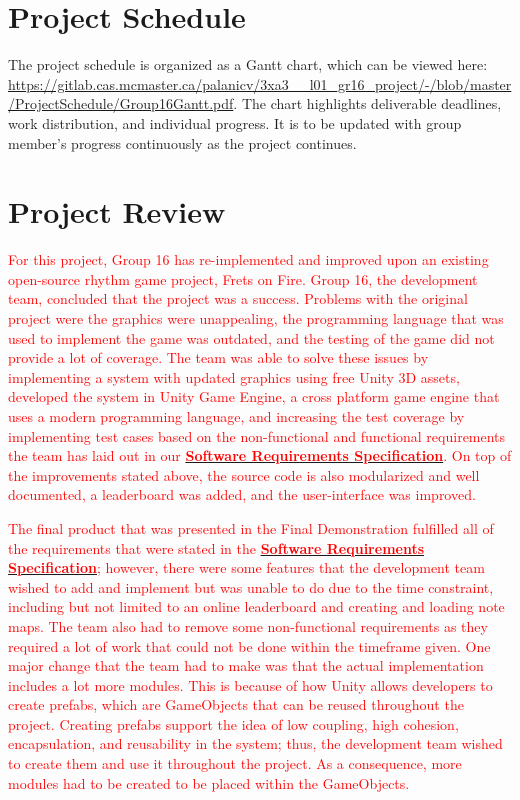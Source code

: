 \documentclass[12pt,letterpaper]{article}
\begin{document}
\section{Project Schedule}
The project schedule is organized as a Gantt chart, which can be viewed here:
\url{https://gitlab.cas.mcmaster.ca/palanicv/3xa3__l01_gr16_project/-/blob/master/ProjectSchedule/Group16Gantt.pdf}.
\newline
The chart highlights deliverable deadlines, work distribution, and individual progress. It is to be updated with group member's progress continuously as the project continues.

\section{Project Review}
\textcolor{red}{For this project, Group 16 has re-implemented and improved upon an existing open-source rhythm game project, Frets on Fire. Group 16, the development team, concluded that the project was a success. Problems with the original project were the graphics were unappealing, the programming language that was used to implement the game was outdated, and the testing of the game did not provide a lot of coverage. The team was able to solve these issues by implementing a system with updated graphics using free Unity 3D assets, developed the system in Unity Game Engine, a cross platform game engine that uses a modern programming language, and increasing the test coverage by implementing test cases based on the non-functional and functional requirements the team has laid out in our \href{https://gitlab.cas.mcmaster.ca/palanicv/3xa3__l01_gr16_project/-/blob/master/Doc/Rev0/SRS/SRS.pdf}{\textcolor{red}{\textbf{Software Requirements Specification}}}. On top of the improvements stated above, the source code is also modularized and well documented, a leaderboard was added, and the user-interface was improved.}

\textcolor{red}{The final product that was presented in the Final Demonstration fulfilled all of the requirements that were stated in the \href{https://gitlab.cas.mcmaster.ca/palanicv/3xa3__l01_gr16_project/-/blob/master/Doc/Rev0/SRS/SRS.pdf}{\textcolor{red}{\textbf{Software Requirements Specification}}}; however, there were some features that the development team wished to add and implement but was unable to do due to the time constraint, including but not limited to an online leaderboard and creating and loading note maps. The team also had to remove some non-functional requirements as they required a lot of work that could not be done within the timeframe given. One major change that the team had to make was that the actual implementation includes a lot more modules. This is because of how Unity allows developers to create prefabs, which are GameObjects that can be reused throughout the project. Creating prefabs support the idea of low coupling, high cohesion, encapsulation, and reusability in the system; thus, the development team wished to create them and use it throughout the project. As a consequence, more modules had to be created to be placed within the GameObjects.}
\end{document}
